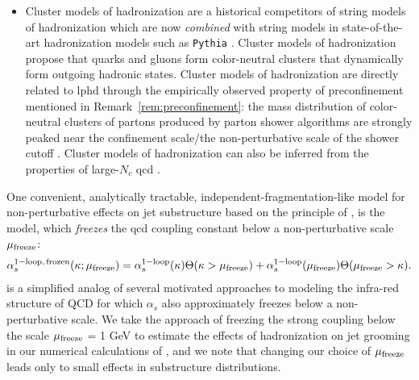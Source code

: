 \begin{subappendices}
\begin{itemize}
    \item

        Cluster models of hadronization are a historical competitors of string models of hadronization \cite{} which are now \textit{combined} with string models in state-of-the-art hadronization models such as \texttt{Pythia} \cite{}.
        Cluster models of hadronization propose that quarks and gluons form color-neutral clusters that dynamically form outgoing hadronic states.
        Cluster models of hadronization are directly related to \gls{lphd} through the empirically observed property of \gls{preconfinement} mentioned in Remark~\ref{rem:preconfinement}:
        the mass distribution of color-neutral clusters of partons produced by parton shower algorithms are strongly peaked near the confinement scale/the non-perturbative scale of the shower cutoff \cite{}.
        Cluster models of hadronization can also be inferred from the properties of large-\(N_c\) \gls{qcd} \cite{}.
\end{itemize}

One convenient, analytically tractable, independent-fragmentation-like model for non-perturbative effects on jet substructure based on the principle of , is the  model, which \textit{freezes} the \gls{qcd} coupling constant below a non-perturbative scale \(\mu_{\rm freeze}\):
\begin{align}
    \alpha^{\rm 1-loop,\,frozen}_s(\kappa; \mu_{\rm freeze})
    =
    \alpha^{\rm 1-loop}_s(\kappa)
    \Theta(\kappa > \mu_{\rm freeze})
    +
    \alpha^{\rm 1-loop}_s(\mu_{\rm freeze})
    \Theta(\mu_{\rm freeze} > \kappa)
    .
    \label{eq:frozen-coupling}
\end{align}
%
 is a simplified analog of several motivated approaches to modeling the infra-red structure of QCD for which \(\alpha_s\) also approximately freezes below a non-perturbative scale.
%
We take the approach of freezing the strong coupling below the scale \(\mu_{\rm freeze}\) = 1 GeV to estimate the effects of hadronization on jet grooming in our numerical calculations of , and we note that changing our choice of \(\mu_{\rm freeze}\) leads only to small effects in substructure distributions.



\end{subappendices}
